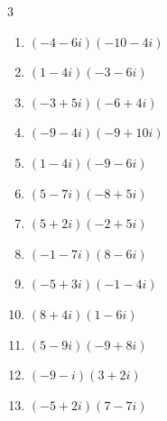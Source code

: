 \begin{multicols}{3}
\begin{enumerate}
        \phantom{$\displaystyle =-15-75i$}

  \item $\displaystyle (-4-6i)(-10-4i)$

        \phantom{$\displaystyle =16+76i$}

  \item $\displaystyle (1-4i)(-3-6i)$

        \phantom{$\displaystyle =-27+6i$}

  \item $\displaystyle (-3+5i)(-6+4i)$

        \phantom{$\displaystyle =-2-42i$}

  \item $\displaystyle (-9-4i)(-9+10i)$

        \phantom{$\displaystyle =121-54i$}

  \item $\displaystyle (1-4i)(-9-6i)$

        \phantom{$\displaystyle =-33+30i$}

  \item $\displaystyle (5-7i)(-8+5i)$

        \phantom{$\displaystyle =-5+81i$}

  \item $\displaystyle (5+2i)(-2+5i)$

        \phantom{$\displaystyle =-20+21i$}

  \item $\displaystyle (-1-7i)(8-6i)$

        \phantom{$\displaystyle =-50-50i$}

  \item $\displaystyle (-5+3i)(-1-4i)$

        \phantom{$\displaystyle =17+17i$}

  \item $\displaystyle (8+4i)(1-6i)$

        \phantom{$\displaystyle =32-44i$}

  \item $\displaystyle (5-9i)(-9+8i)$

        \phantom{$\displaystyle =27+121i$}

  \item $\displaystyle (-9-i)(3+2i)$

        \phantom{$\displaystyle =-25-21i$}

  \item $\displaystyle (-5+2i)(7-7i)$


\end{enumerate}
\end{multicols}
